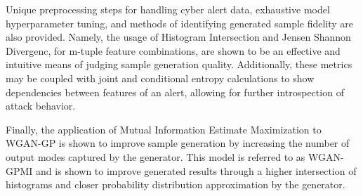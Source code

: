 Unique preprocessing steps for handling cyber alert data, exhaustive model hyperparameter tuning, and methods of identifying generated sample fidelity are also provided. Namely, the usage of Histogram Intersection and Jensen Shannon Divergenc, for m-tuple feature combinations, are shown to be an effective and intuitive means of judging sample generation quality. Additionally, these metrics may be coupled with joint and conditional entropy calculations to show dependencies between features of an alert, allowing for further introspection of attack behavior.

Finally, the application of Mutual Information Estimate Maximization to WGAN-GP is shown to improve sample generation by increasing the number of output modes captured by the generator. This model is referred to as WGAN-GPMI and is shown to improve generated results through a higher intersection of histograms and closer probability distribution approximation by the generator.
